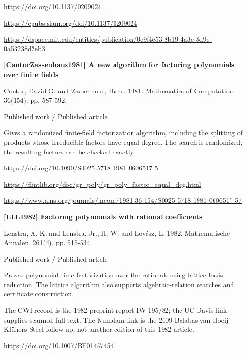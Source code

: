 \documentclass[11pt,a4paper,oneside,openany]{book}
\begin{document}
{\footnotesize\url{https://doi.org/10.1137/0209024}}\par
{\footnotesize\url{https://epubs.siam.org/doi/10.1137/0209024}}\par
{\footnotesize\url{https://dspace.mit.edu/entities/publication/0c9f4e53-8b19-4a3c-8d9e-0a53238d2eb3}}\par
\vspace{9pt}
\hypertarget{ref:CantorZassenhaus1981}{}
{\sffamily\bfseries\color{atlasgreen}[CantorZassenhaus1981] A new algorithm for factoring polynomials over finite fields}\par
\color{black} Cantor, David G. and Zassenhaus, Hans. 1981. Mathematics of Computation. 36(154). pp. 587-592.\par
{\small\sffamily\color{atlasgold}Published work / Published article}\par
\color{black} Gives a randomized finite-field factorization algorithm, including the splitting of products whose irreducible factors have equal degree. The search is randomized; the resulting factors can be checked exactly.\par
{\footnotesize\url{https://doi.org/10.1090/S0025-5718-1981-0606517-5}}\par
{\footnotesize\url{https://flintlib.org/doc/gr_poly/gr_poly_factor_equal_deg.html}}\par
{\footnotesize\url{https://www.ams.org/journals/mcom/1981-36-154/S0025-5718-1981-0606517-5/}}\par
\vspace{9pt}
\hypertarget{ref:LLL1982}{}
{\sffamily\bfseries\color{atlasgreen}[LLL1982] Factoring polynomials with rational coefficients}\par
\color{black} Lenstra, A. K. and Lenstra, Jr., H. W. and Lovász, L. 1982. Mathematische Annalen. 261(4). pp. 515-534.\par
{\small\sffamily\color{atlasgold}Published work / Published article}\par
\color{black} Proves polynomial-time factorization over the rationals using lattice basis reduction. The lattice algorithm also supports algebraic-relation searches and certificate construction.\par
{\small The CWI record is the 1982 preprint report IW 195/82; the UC Davis link supplies scanned full text. The Numdam link is the 2009 Belabas-van Hoeij-Klüners-Steel follow-up, not another edition of this 1982 article.}\par
{\footnotesize\url{https://doi.org/10.1007/BF01457454}}\par
\end{document}
